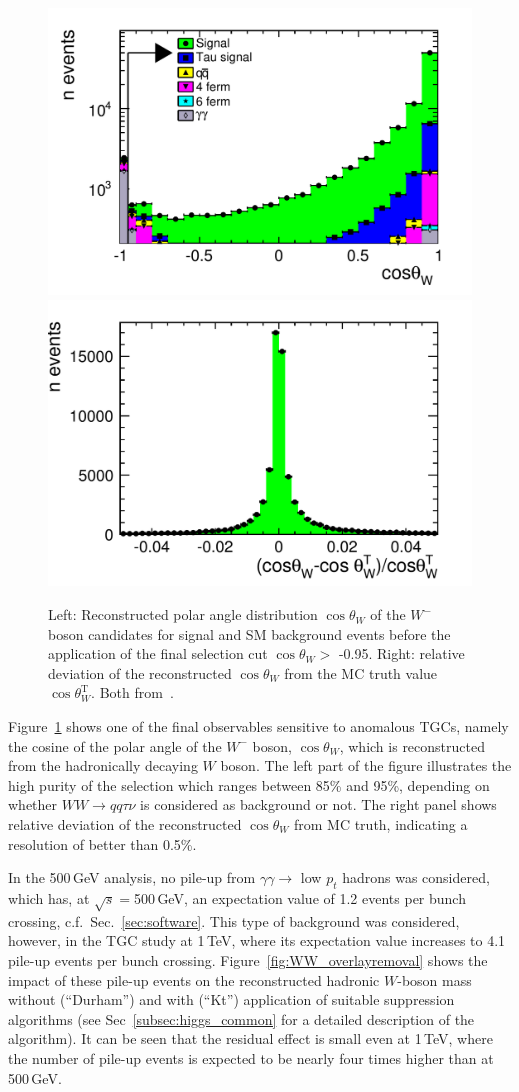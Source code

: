 \begin{figure}[]
\centerline{
\includegraphics[width=0.5\linewidth]{./chapters/figures/ep+30em-80SUMCosThetaWPRE}
\includegraphics[width=0.5\linewidth]{./chapters/figures/ep+30em-80resolutioncostheta}
}
\caption{Left: Reconstructed polar angle distribution $\cos\theta_{W}$ of the $W^-$ boson candidates for signal and SM background events before the application of the final selection cut $\cos\theta_{W} >$ -0.95. Right: relative deviation of the reconstructed $\cos\theta_{W}$ from the MC truth value $\cos\theta_{W}^\mathrm{T}$. Both from~\cite{Marchesini:94888}.}\label{fig:WW_costheta}
\end{figure}

Figure~\ref{fig:WW_costheta} shows one of the final observables sensitive to anomalous TGCs,
namely the cosine of the polar angle of the $W^-$ boson, $\cos\theta_{W}$, which is reconstructed from the hadronically decaying $W$ boson. The left part of the figure illustrates the high purity of the selection which ranges between 85\% and 95\%, depending on whether  $WW \to qq\tau \nu$ is considered as background or not. The right panel shows relative deviation of the reconstructed $\cos\theta_{W}$ from MC truth, indicating a resolution of better than 0.5\%.
 
In the 500\,GeV analysis, no pile-up from $\gamma \gamma \to$ low $p_t$ hadrons was considered, which has, at $\sqrt{s}=$500\,GeV, an expectation value of 1.2 events per bunch crossing, c.f.\ Sec.~\ref{sec:software}.
This type of background was considered, however, in the TGC study at 1\,TeV, where its expectation value increases to 4.1 pile-up events per bunch crossing. Figure~\ref{fig:WW_overlayremoval} shows the impact of these pile-up events on the reconstructed hadronic $W$-boson mass without (``Durham'') and with (``Kt'') application of suitable suppression algorithms (see Sec~\ref{subsec:higgs_common} for a detailed description of the algorithm). It can be seen that the residual effect is small even at 1\,TeV, where the number of pile-up events is expected to be nearly four times higher than at 500\,GeV.


